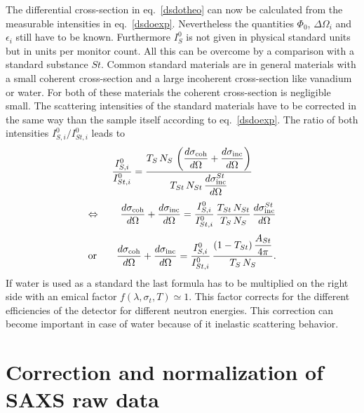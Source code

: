 The differential cross-section in eq.\ \ref{dsdotheo} can now be calculated from the measurable
intensities in eq.\ \ref{dsdoexp}. Nevertheless the quantities $\Phi_0$, $\Delta\Omega_i$ and
$\epsilon_i$ still have to be known. Furthermore $I_S^0$ is not given in physical standard units
but in units per monitor count. All this can be overcome by a comparison with a standard substance
$St$. Common standard materials are in general materials with a small coherent cross-section and a
large incoherent cross-section like vanadium or water. For both of these materials the coherent
cross-section is negligible small. The scattering intensities of the standard materials have to be
corrected in the same way than the sample itself according to eq.\ \ref{dsdoexp}. The ratio of both
intensities $I^0_{S,i}/I^0_{St,i}$ leads to
\begin{equation}
\frac{I^0_{S,i}}{I^0_{St,i}} = \frac{T_S\, N_S\, \displaystyle
\left(\frac{d\sigma_{\rm coh}}{d \Omega} +
\frac{d\sigma_{\rm inc}}{d\Omega} \right)}{T_{St}\,N_{St}\, \displaystyle
\frac{d\sigma^{St}_{\rm inc}}{d\Omega}}
\end{equation}
\begin{equation}
\Leftrightarrow \qquad \displaystyle
\frac{d\sigma_{\rm coh}}{d\Omega} + \frac{d\sigma_{\rm inc}}{d\Omega} =
\frac{I^0_{S,i}}{I^0_{St,i}} \, \frac{T_{St}\, N_{St}}{T_S\, N_S}\,
\displaystyle
\frac{d\sigma^{St}_{\rm inc}}{d\Omega}
\end{equation}
\begin{equation} \displaystyle
\mbox{or}\qquad
\frac{d\sigma_{\rm coh}}{d\Omega} + \frac{d\sigma_{\rm inc}}{d\Omega} =
\frac{I^0_{S,i}}{I^0_{St,i}} \, \frac{(1-T_{St})\, \displaystyle
\frac{A_{St}}{4\pi}}{T_S\, N_S} .
\end{equation}
If water is used as a standard the last formula has to be multiplied on the right
side with an emical factor $f(\lambda,\sigma_t,T) \simeq 1$. This factor corrects for
the different efficiencies of the detector for different neutron energies. This correction
can become important in case of water because of it inelastic scattering behavior.

\section{Correction and normalization of SAXS raw data}
